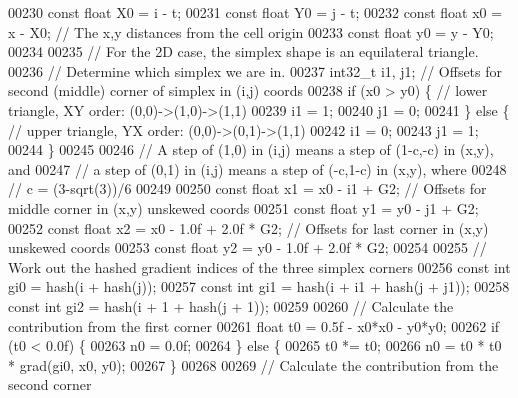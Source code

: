 \begin{DoxyCode}
00230     \textcolor{keyword}{const} \textcolor{keywordtype}{float} X0 = i - t;
00231     \textcolor{keyword}{const} \textcolor{keywordtype}{float} Y0 = j - t;
00232     \textcolor{keyword}{const} \textcolor{keywordtype}{float} x0 = x - X0;  \textcolor{comment}{// The x,y distances from the cell origin}
00233     \textcolor{keyword}{const} \textcolor{keywordtype}{float} y0 = y - Y0;
00234 
00235     \textcolor{comment}{// For the 2D case, the simplex shape is an equilateral triangle.}
00236     \textcolor{comment}{// Determine which simplex we are in.}
00237     int32\_t i1, j1;  \textcolor{comment}{// Offsets for second (middle) corner of simplex in (i,j) coords}
00238     \textcolor{keywordflow}{if} (x0 > y0) \{   \textcolor{comment}{// lower triangle, XY order: (0,0)->(1,0)->(1,1)}
00239         i1 = 1;
00240         j1 = 0;
00241     \} \textcolor{keywordflow}{else} \{   \textcolor{comment}{// upper triangle, YX order: (0,0)->(0,1)->(1,1)}
00242         i1 = 0;
00243         j1 = 1;
00244     \}
00245 
00246     \textcolor{comment}{// A step of (1,0) in (i,j) means a step of (1-c,-c) in (x,y), and}
00247     \textcolor{comment}{// a step of (0,1) in (i,j) means a step of (-c,1-c) in (x,y), where}
00248     \textcolor{comment}{// c = (3-sqrt(3))/6}
00249 
00250     \textcolor{keyword}{const} \textcolor{keywordtype}{float} x1 = x0 - i1 + G2;            \textcolor{comment}{// Offsets for middle corner in (x,y) unskewed coords}
00251     \textcolor{keyword}{const} \textcolor{keywordtype}{float} y1 = y0 - j1 + G2;
00252     \textcolor{keyword}{const} \textcolor{keywordtype}{float} x2 = x0 - 1.0f + 2.0f * G2;   \textcolor{comment}{// Offsets for last corner in (x,y) unskewed coords}
00253     \textcolor{keyword}{const} \textcolor{keywordtype}{float} y2 = y0 - 1.0f + 2.0f * G2;
00254 
00255     \textcolor{comment}{// Work out the hashed gradient indices of the three simplex corners}
00256     \textcolor{keyword}{const} \textcolor{keywordtype}{int} gi0 = hash(i + hash(j));
00257     \textcolor{keyword}{const} \textcolor{keywordtype}{int} gi1 = hash(i + i1 + hash(j + j1));
00258     \textcolor{keyword}{const} \textcolor{keywordtype}{int} gi2 = hash(i + 1 + hash(j + 1));
00259 
00260     \textcolor{comment}{// Calculate the contribution from the first corner}
00261     \textcolor{keywordtype}{float} t0 = 0.5f - x0*x0 - y0*y0;
00262     \textcolor{keywordflow}{if} (t0 < 0.0f) \{
00263         n0 = 0.0f;
00264     \} \textcolor{keywordflow}{else} \{
00265         t0 *= t0;
00266         n0 = t0 * t0 * grad(gi0, x0, y0);
00267     \}
00268 
00269     \textcolor{comment}{// Calculate the contribution from the second corner}

\end{DoxyCode}
